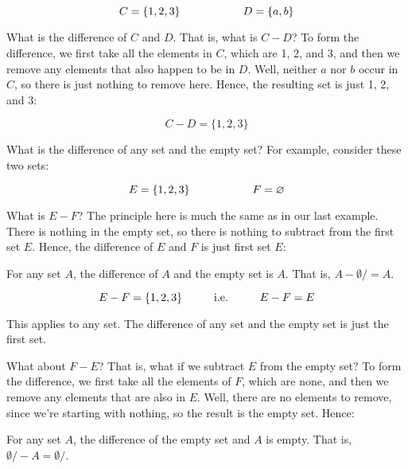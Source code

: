 \documentclass[../../../main.tex]{subfiles}
\begin{document}
\begin{equation*}
  C = \{ 1, 2, 3 \} \hskip 2cm D = \{ a, b \}
\end{equation*}

What is the difference of $C$ and $D$. That is, what is $C - D$? To form the difference, we first take all the elements in $C$, which are 1, 2, and 3, and then we remove any elements that also happen to be in $D$. Well, neither $a$ nor $b$ occur in $C$, so there is just nothing to remove here. Hence, the resulting set is just 1, 2, and 3:

\begin{equation*}
  C - D = \{ 1, 2, 3 \}
\end{equation*}

What is the difference of any set and the empty set? For example, consider these two sets:

\begin{equation*}
  E = \{ 1, 2, 3 \} \hskip 2cm F = \emptyset/
\end{equation*}

What is $E - F$? The principle here is much the same as in our last example. There is nothing in the empty set, so there is nothing to subtract from the first set $E$. Hence, the difference of $E$ and $F$ is just first set $E$:

\begin{aside}
  \begin{remark}
    For any set $A$, the difference of $A$ and the empty set is $A$. That is, $A - \emptyset/ = A$.
  \end{remark}
\end{aside}

\begin{equation*}
  E - F = \{ 1, 2, 3 \} \hskip 1cm \text{i.e.} \hskip 1cm E - F = E
\end{equation*} 

This applies to any set. The difference of any set and the empty set is just the first set.

What about $F - E$? That is, what if we subtract $E$ from the empty set? To form the difference, we first take all the elements of $F$, which are none, and then we remove any elements that are also in $E$. Well, there are no elements to remove, since we're starting with nothing, so the result is the empty set. Hence:

\begin{aside}
  \begin{remark}
    For any set $A$, the difference of the empty set and $A$ is empty. That is, $\emptyset/ - A = \emptyset/$.
  \end{remark}
\end{aside}
\end{document}
